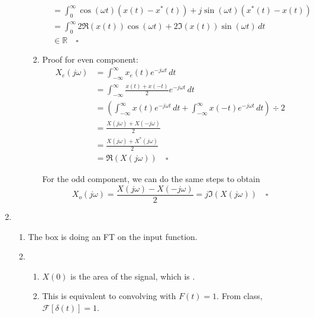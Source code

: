 \documentclass[12pt]{article}
\begin{document}
\begin{enumerate}
\begin{enumerate}
\begin{enumerate}
\[\begin{aligned}
                                                 & = \int_{0}^{\infty} \cos(\omega t)(x(t)-x^*(t))+j\sin(\omega t)(x^*(t)-x(t)) \\
                                                 & = \int_{0}^{\infty} 2\Re(x(t))\cos(\omega t)+2\Im(x(t))\sin(\omega t)\,dt    \\
                                                 & \in \mathbb{R}\quad\square
                                          \end{aligned}\]
                              \item Proof for even component:
                                    \begin{align*}
                                          X_e(j\omega)
                                           & = \int_{-\infty}^{\infty} x_e(t)e^{-j\omega t}\,dt                                                                     \\
                                           & = \int_{-\infty}^{\infty} \frac{x(t)+x(-t)}{2}e^{-j\omega t}\,dt                                                       \\
                                           & = \left(\int_{-\infty}^{\infty} x(t)e^{-j\omega t}\,dt + \int_{-\infty}^{\infty} x(-t)e^{-j\omega t}\,dt\right) \div 2 \\
                                           & = \frac{X(j\omega)+X(-j\omega)}{2}                                                                                     \\
                                           & = \frac{X(j\omega)+X^*(j\omega)}{2}                                                                                    \\
                                           & = \Re(X(j\omega))\quad\square
                                    \end{align*}

                                    For the odd component, we can do the same steps to obtain
                                    \[X_o(j\omega)=\frac{X(j\omega)-X(-j\omega)}{2}=j\Im(X(j\omega))\quad\square\]
                        \end{enumerate}
            \end{enumerate}
      \item \begin{enumerate}
                  \item The box is doing an FT on the input function.
                  \item \begin{enumerate}
                              \item $X(0)$ is the area of the signal, which is .
                              \item This is equivalent to convolving with $F(t)=1$.
                                    From class, $\mathcal{F}[\delta(t)]=1$.


\end{enumerate}
\end{enumerate}
\end{enumerate}
\end{document}
